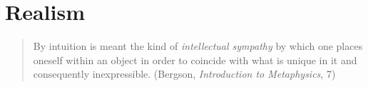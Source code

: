 \chapter{Realism} %
\label{cha:realism}

\begin{quote}
	By intuition is meant the kind of \emph{intellectual sympathy} by which one places oneself within an object in order to coincide with what is unique in it and consequently inexpressible. (Bergson, \emph{Introduction to Metaphysics}, 7)
\end{quote}

